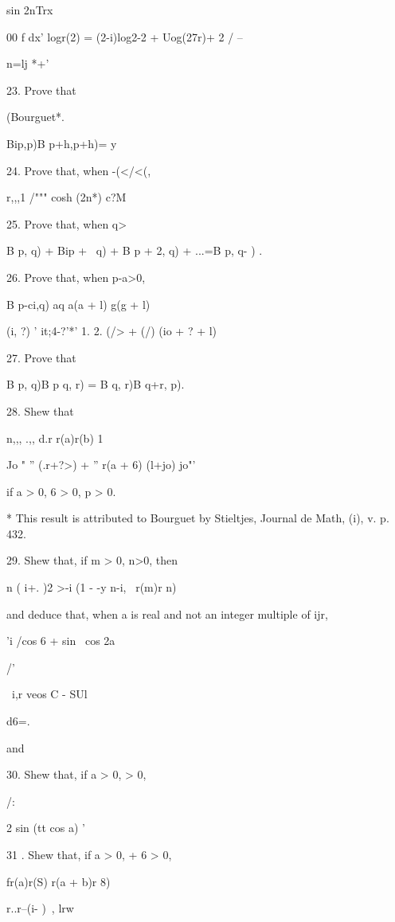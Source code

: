 sin 2nTrx

00 f dx' logr(2) = (2-i)log2-2 + Uog(27r)+ 2 / --

n=lj *+'

23. Prove that

(Bourguet*.

Bip,p)B p+h,p+h)= y 

24. Prove that, when -(</<(,

r,,,1 /""" cosh (2n*) c?M

25. Prove that, when q>\,

B p, q) + Bip + \, q) + B p + 2, q) + ...=B p, q- ) .

26. Prove that, when p-a>0,

B p-ci,q) aq a(a + l) g(g + l)

 (i, ?) ' it;4-?'*' 1. 2. (/> + (/) (io + ? + l)

27. Prove that

B p, q)B p q, r) = B q, r)B q+r, p). 

28. Shew that

n,,, .,, d.r r(a)r(b) 1

Jo " '' (.r+?>) + '' r(a + 6) (l+jo) jo"'

if a > 0, 6 > 0, p > 0. 

* This result is attributed to Bourguet by Stieltjes, Journal de Math,
(i), v. p. 432.

%
%

29. Shew that, if m > 0, n>0, then

n ( i+. )2 >-i (1 - -y n-i, \ r(m)r n)

and deduce that, when a is real and not an integer multiple of ijr,

'i /cos 6 + sin \ cos 2a

/'

\ i,r veos C - SUl

d6=.

and

30. Shew that, if a > 0, > 0,

/:

2 sin (tt cos a) '



31 . Shew that, if a > 0, + 6 > 0,

fr(a)r(S) r(a + b)r 8)

r..r--(i- ) \,, lrw

